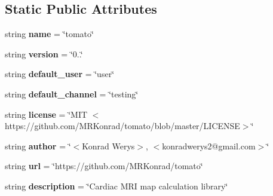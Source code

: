\subsection*{Static Public Attributes}
\begin{DoxyCompactItemize}
\item 
string {\bfseries name} = \char`\"{}tomato\char`\"{}\hypertarget{classconanfile_1_1_tomato_conan_a26f4f87833604bd28140d0062e930f8f}{}\label{classconanfile_1_1_tomato_conan_a26f4f87833604bd28140d0062e930f8f}

\item 
string {\bfseries version} = \char`\"{}0..\char`\"{}\hypertarget{classconanfile_1_1_tomato_conan_ac4db737292ee0a860b9e468871509f36}{}\label{classconanfile_1_1_tomato_conan_ac4db737292ee0a860b9e468871509f36}

\item 
string {\bfseries default\+\_\+user} = \char`\"{}user\char`\"{}\hypertarget{classconanfile_1_1_tomato_conan_a1f839390c62b128c11967cc1000a1273}{}\label{classconanfile_1_1_tomato_conan_a1f839390c62b128c11967cc1000a1273}

\item 
string {\bfseries default\+\_\+channel} = \char`\"{}testing\char`\"{}\hypertarget{classconanfile_1_1_tomato_conan_ab7a270678d4bf3094ee5fbecf7361e78}{}\label{classconanfile_1_1_tomato_conan_ab7a270678d4bf3094ee5fbecf7361e78}

\item 
string {\bfseries license} = \char`\"{}M\+IT $<$https\+://github.\+com/M\+R\+Konrad/tomato/blob/master/L\+I\+C\+E\+N\+SE$>$\char`\"{}\hypertarget{classconanfile_1_1_tomato_conan_ac0f0743fe288011bbc028362204d495f}{}\label{classconanfile_1_1_tomato_conan_ac0f0743fe288011bbc028362204d495f}

\item 
string {\bfseries author} = \char`\"{}$<$Konrad Werys$>$, $<$konradwerys2@gmail.\+com$>$\char`\"{}\hypertarget{classconanfile_1_1_tomato_conan_a059e432130ff22b36078bed2140ec9dc}{}\label{classconanfile_1_1_tomato_conan_a059e432130ff22b36078bed2140ec9dc}

\item 
string {\bfseries url} = \char`\"{}https\+://github.\+com/M\+R\+Konrad/tomato\char`\"{}\hypertarget{classconanfile_1_1_tomato_conan_af61fca8c34aeba497300fad37bf7d35b}{}\label{classconanfile_1_1_tomato_conan_af61fca8c34aeba497300fad37bf7d35b}

\item 
string {\bfseries description} = \char`\"{}Cardiac M\+RI map calculation library\char`\"{}\hypertarget{classconanfile_1_1_tomato_conan_a3c8eb0e317ab433a5fef269b3a347a21}{}\label{classconanfile_1_1_tomato_conan_a3c8eb0e317ab433a5fef269b3a347a21}


\end{DoxyCompactItemize}
